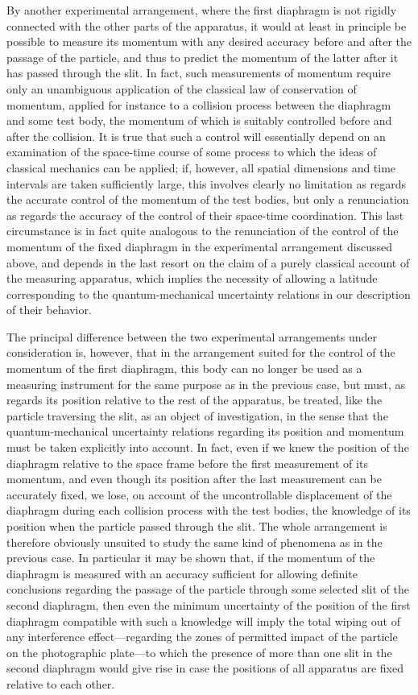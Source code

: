 \documentclass[11pt]{memoir}
\begin{document}
By another experimental arrangement, where the first diaphragm is not
rigidly connected with the other parts of the apparatus, it would at
least in principle be possible to measure its momentum with any desired
accuracy before and after the passage of the particle, and thus to
predict the momentum of the latter after it has passed through the slit.
In fact, such measurements of momentum require only an unambiguous
application of the classical law of conservation of momentum, applied
for instance to a collision process between the diaphragm and some test
body, the momentum of which is suitably controlled before and after the
collision. It is true that such a control will essentially depend on an
examination of the space-time course of some process to which the ideas
of classical mechanics can be applied; if, however, all spatial
dimensions and time intervals are taken sufficiently large, this
involves clearly no limitation as regards the accurate control of the
momentum of the test bodies, but only a renunciation as regards the
accuracy of the control of their space-time coordination. This last
circumstance is in fact quite analogous to the renunciation of the
control of the momentum of the fixed diaphragm in the experimental
arrangement discussed above, and depends in the last resort on the claim
of a purely classical account of the measuring apparatus, which implies
the necessity of allowing a latitude corresponding to the
quantum-mechanical uncertainty relations in our description of their
behavior.

The principal difference between the two experimental arrangements under
consideration is, however, that in the arrangement suited for the
control of the momentum of the first diaphragm, this body can no longer
be used as a measuring instrument for the same purpose as in the
previous case, but must, as regards its position relative to the rest of
the apparatus, be treated, like the particle traversing the slit, as an
object of investigation, in the sense that the quantum-mechanical
uncertainty relations regarding its position and momentum must be taken
explicitly into account. In fact, even if we knew the position of the
diaphragm relative to the space frame before the first measurement of
its momentum, and even though its position after the last measurement
can be accurately fixed, we lose, on account of the uncontrollable
displacement of the diaphragm during each collision process with the
test bodies, the knowledge of its position when the particle passed
through the slit. The whole arrangement is therefore obviously unsuited
to study the same kind of phenomena as in the previous case. In
particular it may be shown that, if the momentum of the diaphragm is
measured with an accuracy sufficient for allowing definite conclusions
regarding the passage of the particle through some selected slit of the
second diaphragm, then even the minimum uncertainty of the position of
the first diaphragm compatible with such a knowledge will imply the
total wiping out of any interference effect---regarding the zones of
permitted impact of the particle on the photographic plate---to which
the presence of more than one slit in the second diaphragm would give
rise in case the positions of all apparatus are fixed relative to each
other.
\end{document}

